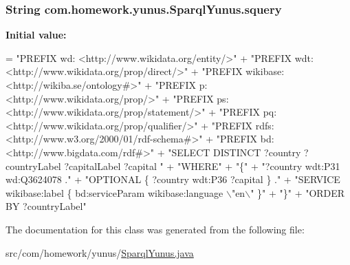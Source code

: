 \subsubsection[{\texorpdfstring{squery}{squery}}]{\setlength{\rightskip}{0pt plus 5cm}String com.\+homework.\+yunus.\+Sparql\+Yunus.\+squery\hspace{0.3cm}{\ttfamily [private]}}\hypertarget{classcom_1_1homework_1_1yunus_1_1_sparql_yunus_ab6cecc25b9305e7ea928f09f380e6137}{}\label{classcom_1_1homework_1_1yunus_1_1_sparql_yunus_ab6cecc25b9305e7ea928f09f380e6137}
{\bfseries Initial value\+:}
\begin{DoxyCode}
= \textcolor{stringliteral}{"PREFIX wd: <http://www.wikidata.org/entity/>"}
            + \textcolor{stringliteral}{"PREFIX wdt: <http://www.wikidata.org/prop/direct/>"}
            + \textcolor{stringliteral}{"PREFIX wikibase: <http://wikiba.se/ontology#>"}
            + \textcolor{stringliteral}{"PREFIX p: <http://www.wikidata.org/prop/>"}
            + \textcolor{stringliteral}{"PREFIX ps: <http://www.wikidata.org/prop/statement/>"}
            + \textcolor{stringliteral}{"PREFIX pq: <http://www.wikidata.org/prop/qualifier/>"}
            + \textcolor{stringliteral}{"PREFIX rdfs: <http://www.w3.org/2000/01/rdf-schema#>"}
            + \textcolor{stringliteral}{"PREFIX bd: <http://www.bigdata.com/rdf#>"}
            + \textcolor{stringliteral}{"SELECT DISTINCT ?country ?countryLabel ?capitalLabel ?capital "}
            + \textcolor{stringliteral}{"WHERE"}
            + \textcolor{stringliteral}{"\{"}
            + \textcolor{stringliteral}{"?country wdt:P31 wd:Q3624078 ."}
            + \textcolor{stringliteral}{"OPTIONAL \{ ?country wdt:P36 ?capital \} ."}
            + \textcolor{stringliteral}{"SERVICE wikibase:label \{ bd:serviceParam wikibase:language \(\backslash\)"en\(\backslash\)" \}"}
            + \textcolor{stringliteral}{"\}"}
            + \textcolor{stringliteral}{"ORDER BY ?countryLabel"}
\end{DoxyCode}


The documentation for this class was generated from the following file\+:\begin{DoxyCompactItemize}
\item 
src/com/homework/yunus/\hyperlink{_sparql_yunus_8java}{Sparql\+Yunus.\+java}\end{DoxyCompactItemize}
